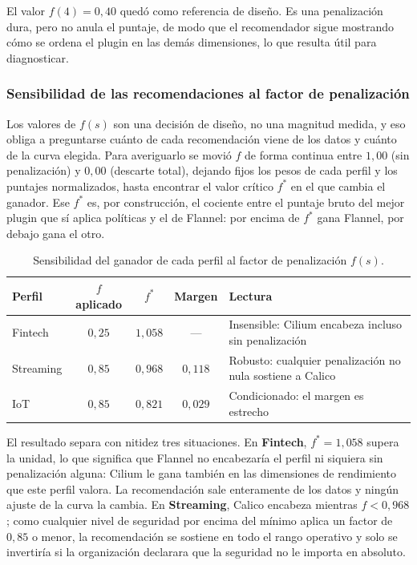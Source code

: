 El valor $f(4)=0{,}40$ quedó como referencia de diseño. Es una penalización dura, pero no anula el puntaje, de modo que el recomendador sigue mostrando cómo se ordena el plugin en las demás dimensiones, lo que resulta útil para diagnosticar.

\subsubsection{Sensibilidad de las recomendaciones al factor de penalización} \label{sec:sensibilidad_fs}

Los valores de $f(s)$ son una decisión de diseño, no una magnitud medida, y eso obliga a preguntarse cuánto de cada recomendación viene de los datos y cuánto de la curva elegida. Para averiguarlo se movió $f$ de forma continua entre $1{,}00$ (sin penalización) y $0{,}00$ (descarte total), dejando fijos los pesos de cada perfil y los puntajes normalizados, hasta encontrar el valor crítico $f^{*}$ en el que cambia el ganador. Ese $f^{*}$ es, por construcción, el cociente entre el puntaje bruto del mejor plugin que sí aplica políticas y el de Flannel: por encima de $f^{*}$ gana Flannel, por debajo gana el otro.

\begin{table}[htbp]
\centering
\small
\caption{Sensibilidad del ganador de cada perfil al factor de penalización $f(s)$.}
\label{tab:sensibilidad_fs}
\begin{tabularx}{\textwidth}{|Y|c|c|c|Y|}
\hline
\textbf{Perfil} & \textbf{$f$ aplicado} & \textbf{$f^{*}$} & \textbf{Margen} & \textbf{Lectura} \\
\hline
Fintech & $0{,}25$ & $1{,}058$ & --- & Insensible: Cilium encabeza incluso sin penalización \\
\hline
Streaming & $0{,}85$ & $0{,}968$ & $0{,}118$ & Robusto: cualquier penalización no nula sostiene a Calico \\
\hline
IoT & $0{,}85$ & $0{,}821$ & $0{,}029$ & Condicionado: el margen es estrecho \\
\hline
\end{tabularx}
\end{table}

El resultado separa con nitidez tres situaciones. En \textbf{Fintech}, $f^{*}=1{,}058$ supera la unidad, lo que significa que Flannel no encabezaría el perfil ni siquiera sin penalización alguna: Cilium le gana también en las dimensiones de rendimiento que este perfil valora. La recomendación sale enteramente de los datos y ningún ajuste de la curva la cambia. En \textbf{Streaming}, Calico encabeza mientras $f<0{,}968$; como cualquier nivel de seguridad por encima del mínimo aplica un factor de $0{,}85$ o menor, la recomendación se sostiene en todo el rango operativo y solo se invertiría si la organización declarara que la seguridad no le importa en absoluto.

